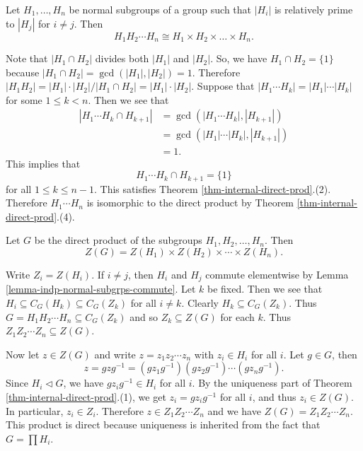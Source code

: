 \begin{corollary} \label{cor-direct-product-isom-to-product-subgrps}
	Let $H_1, \dots, H_n$ be normal subgroups of a group such that $|H_i|$ is relatively prime to $|H_j|$ for $i \neq j$. Then \begin{equation*}
		H_1H_2 \cdots H_n \cong H_1 \times H_2 \times \dots \times H_n.
	\end{equation*} 
\end{corollary}
\begin{sketch}
	Note that $|H_1 \cap H_2|$ divides both $|H_1|$ and $|H_2|$. So, we have $H_1 \cap H_2 = \{1\}$ because $|H_1 \cap H_2| = \gcd(|H_1|, |H_2|) = 1$. Therefore $|H_1 H_2| =|H_1| \cdot |H_2|/|H_1 \cap H_2| =   |H_1| \cdot |H_2|$. Suppose that $|H_1 \cdots H_{k}| = |H_1| \cdots |H_{k}|$ for some $1\leq k< n$. Then we see that 
	\begin{align*}
		|H_1 \cdots H_{k} \cap H_{k+1}| &= \gcd(|H_1 \cdots H_{k}| , |H_{k+1}|) 
		\\
		&= \gcd(|H_1| \cdots |H_{k}| , |H_{k+1}|)
		\\
		&= 1. 
	\end{align*}
	This implies that 
	\begin{equation*}
		H_1 \cdots H_{k} \cap H_{k+1} = \{1\}
	\end{equation*}
	for all $1\leq k\leq n-1$. This satisfies Theorem \ref{thm-internal-direct-prod}.(2). Therefore $H_1 \cdots H_n$ is isomorphic to the direct product by Theorem \ref{thm-internal-direct-prod}.(4).
\end{sketch}
\begin{corollary} \label{cor-center-of-direct-product}
	Let $G$ be the direct product of the subgroups $H_1, H_2, \dots, H_n$. Then 
	\begin{equation*}
		Z(G) = Z(H_1) \times Z(H_2) \times \cdots \times Z(H_n).
	\end{equation*}
\end{corollary}
\begin{sketch}
	
	Write $Z_i = Z(H_i)$. If $i \ne j$, then $H_i$ and $H_j$ commute elementwise by Lemma \ref{lemma-indp-normal-subgrps-commute}. Let $k$ be fixed. Then we see that $H_i \subseteq C_G(H_k) \subseteq C_G(Z_k)$ for all $i\neq k$. Clearly $H_k \subseteq C_G(Z_k)$. Thus
	$G =  H_1H_2\cdots H_n \subseteq C_G(Z_k)$
	and so $Z_k \subseteq Z(G)$ for each $k$. Thus $Z_1Z_2\cdots Z_n \subseteq Z(G)$.
	
	Now let $z \in Z(G)$ and write $z = z_1 z_2 \cdots z_n$ with $z_i \in H_i$ for all $i$. Let $g \in G$, then
	$$z = gzg^{-1} = (gz_1g^{-1})(gz_2g^{-1}) \cdots (gz_ng^{-1}).$$
	Since $H_i\lhd G$, we have $gz_ig^{-1} \in H_i$ for all $i$. By the uniqueness part of Theorem \ref{thm-internal-direct-prod}.(1), we get  $z_i = gz_ig^{-1}$ for all $i$, and thus $z_i \in Z(G)$. In particular, $z_i \in Z_i$. Therefore $z \in Z_1Z_2\cdots Z_n$ and we have $Z(G) = Z_1Z_2\cdots Z_n$. This product is direct  because uniqueness is inherited from the fact that $G = \prod H_i$.
\end{sketch}
